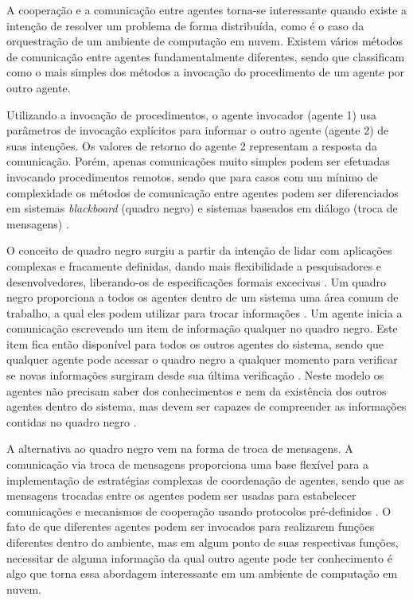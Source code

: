 A cooperação e a comunicação entre agentes torna-se interessante quando existe a intenção de resolver um problema de forma distribuída, como é o caso da orquestração de um ambiente de computação em nuvem. Existem vários métodos de comunicação entre agentes fundamentalmente diferentes, sendo que  classificam como o mais simples dos métodos a invocação do procedimento de um agente por outro agente.

Utilizando a invocação de procedimentos, o agente invocador (agente 1) usa parâmetros de invocação explícitos para informar o outro agente (agente 2) de suas intenções. Os valores de retorno do agente 2 representam a resposta da comunicação. Porém, apenas comunicações muito simples podem ser efetuadas invocando procedimentos remotos, sendo que para casos com um mínimo de complexidade os métodos de comunicação entre agentes podem ser diferenciados em sistemas \emph{blackboard} (quadro negro) e sistemas baseados em diálogo (troca de mensagens) \cite{intelligent}.

O conceito de quadro negro surgiu a partir da intenção de lidar com aplicações complexas e fracamente definidas, dando mais flexibilidade a pesquisadores e desenvolvedores, liberando-os de especificações formais excecivas \cite{blackboard}. Um quadro negro proporciona a todos os agentes dentro de um sistema uma área comum de trabalho, a qual eles podem utilizar para trocar informações \cite{intelligent}. Um agente inicia a comunicação escrevendo um item de informação qualquer no quadro negro. Este item fica então disponível para todos os outros agentes do sistema, sendo que qualquer agente pode acessar o quadro negro a qualquer momento para verificar se novas informações surgiram desde sua última verificação \cite{intelligent}. Neste modelo os agentes não precisam saber dos conhecimentos e nem da existência dos outros agentes dentro do sistema, mas devem ser capazes de compreender as informações contidas no quadro negro \cite{blackboard}.

A alternativa ao quadro negro vem na forma de troca de mensagens. A comunicação via troca de mensagens proporciona uma base flexível para a implementação de estratégias complexas de coordenação de agentes, sendo que as mensagens trocadas entre os agentes podem ser usadas para estabelecer comunicações e mecanismos de cooperação usando protocolos pré-definidos \cite{intelligent}. O fato de que diferentes agentes podem ser invocados para realizarem funções diferentes dentro do ambiente, mas em algum ponto de suas respectivas funções, necessitar de alguma informação da qual outro agente pode ter conhecimento \cite{handbook-intelligence} é algo que torna essa abordagem interessante em um ambiente de computação em nuvem.
